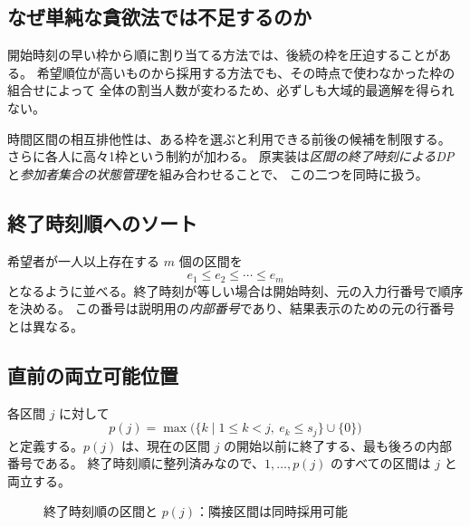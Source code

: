 \documentclass[11pt,a4paper]{ltjsarticle}
\theoremstyle{definition}
\theoremstyle{remark}
\begin{document}
\subsection{なぜ単純な貪欲法では不足するのか}
開始時刻の早い枠から順に割り当てる方法では、後続の枠を圧迫することがある。
希望順位が高いものから採用する方法でも、その時点で使わなかった枠の組合せによって
全体の割当人数が変わるため、必ずしも大域的最適解を得られない。

時間区間の相互排他性は、ある枠を選ぶと利用できる前後の候補を制限する。
さらに各人に高々1枠という制約が加わる。
原実装は\emph{区間の終了時刻によるDP}と\emph{参加者集合の状態管理}を組み合わせることで、
この二つを同時に扱う。

\subsection{終了時刻順へのソート}
希望者が一人以上存在する $m$ 個の区間を
\[
 e_1\leq e_2\leq\cdots\leq e_m
\]
となるように並べる。終了時刻が等しい場合は開始時刻、元の入力行番号で順序を決める。
この番号は説明用の\emph{内部番号}であり、結果表示のための元の行番号とは異なる。

\subsection{直前の両立可能位置}
各区間 $j$ に対して
\begin{equation}
 p(j)=\max\bigl(\{k\mid 1\leq k<j,\ e_k\leq s_j\}\cup\{0\}\bigr)
 \label{eq:pred}
\end{equation}
と定義する。$p(j)$ は、現在の区間 $j$ の開始以前に終了する、最も後ろの内部番号である。
終了時刻順に整列済みなので、$1,\ldots,p(j)$ のすべての区間は $j$ と両立する。

\begin{figure}[htbp]
\centering
{}
\caption{終了時刻順の区間と $p(j)$：隣接区間は同時採用可能}
\label{fig:intervals}
\end{figure}
\end{document}
